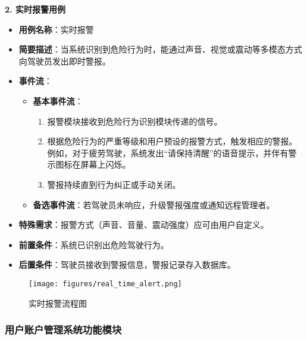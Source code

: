 \documentclass[a4paper,12pt]{article}
\begin{document}
\textbf{2. 实时报警用例}
\begin{itemize}
    \item \textbf{用例名称}：实时报警
    \item \textbf{简要描述}：当系统识别到危险行为时，能通过声音、视觉或震动等多模态方式向驾驶员发出即时警报。
    \item \textbf{事件流}：
    \begin{itemize}
        \item \textbf{基本事件流}：
        \begin{enumerate}
            \item 报警模块接收到危险行为识别模块传递的信号。
            \item 根据危险行为的严重等级和用户预设的报警方式，触发相应的警报。例如，对于疲劳驾驶，系统发出“请保持清醒”的语音提示，并伴有警示图标在屏幕上闪烁。
            \item 警报持续直到行为纠正或手动关闭。
        \end{enumerate}
        \item \textbf{备选事件流}：若驾驶员未响应，升级警报强度或通知远程管理者。
    \end{itemize}
    \item \textbf{特殊需求}：报警方式（声音、音量、震动强度）应可由用户自定义。
    \item \textbf{前置条件}：系统已识别出危险驾驶行为。
    \item \textbf{后置条件}：驾驶员接收到警报信息，警报记录存入数据库。
\end{itemize}

\begin{figure}[htbp]
    \centering
    \texttt{[image: figures/real\_time\_alert.png]}
    \caption{实时报警流程图}
    \label{fig:real_time_alert}
\end{figure}

\subsubsection{用户账户管理系统功能模块}
\end{document}
